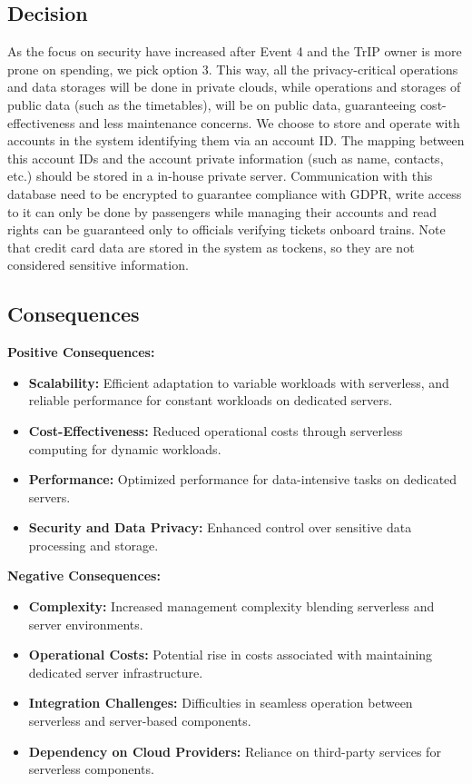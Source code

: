 \subsection*{Decision}
As the focus on security have increased after Event 4 and the TrIP owner is more prone on spending, we pick option 3. This way, all the privacy-critical operations and data storages will be done in private clouds, while operations and storages of public data (such as the timetables),
will be on public data, guaranteeing cost-effectiveness and less maintenance concerns.
We choose to store and operate with accounts in the system identifying them via an account ID. The mapping between this account IDs and the account private information (such as name, contacts, etc.) should be stored in a in-house private server.
Communication with this database need to be encrypted to guarantee compliance with GDPR, write access to it can only be done by passengers while managing their accounts and read rights can be guaranteed only to officials verifying tickets onboard trains.
Note that credit card data are stored in the system as tockens, so they are not considered sensitive information.

\subsection*{Consequences}
\textbf{Positive Consequences:}
\begin{itemize}
    \item \textbf{Scalability:} Efficient adaptation to variable workloads with serverless, and reliable performance for constant workloads on dedicated servers.
    \item \textbf{Cost-Effectiveness:} Reduced operational costs through serverless computing for dynamic workloads.
    \item \textbf{Performance:} Optimized performance for data-intensive tasks on dedicated servers.
    \item \textbf{Security and Data Privacy:} Enhanced control over sensitive data processing and storage.
\end{itemize}

\textbf{Negative Consequences:}
\begin{itemize}
    \item \textbf{Complexity:} Increased management complexity blending serverless and server environments.
    \item \textbf{Operational Costs:} Potential rise in costs associated with maintaining dedicated server infrastructure.
    \item \textbf{Integration Challenges:} Difficulties in seamless operation between serverless and server-based components.
    \item \textbf{Dependency on Cloud Providers:} Reliance on third-party services for serverless components.
\end{itemize}
